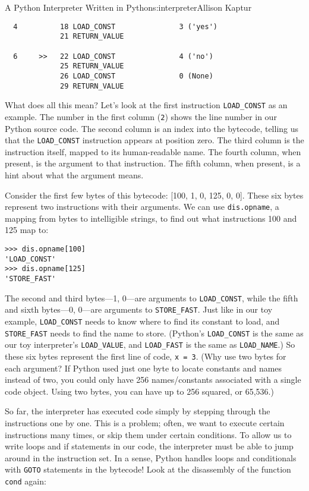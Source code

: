 \begin{aosachapter}{A Python Interpreter Written in Python}{s:interpreter}{Allison Kaptur}
\begin{verbatim}
  4          18 LOAD_CONST               3 ('yes')
             21 RETURN_VALUE

  6     >>   22 LOAD_CONST               4 ('no')
             25 RETURN_VALUE
             26 LOAD_CONST               0 (None)
             29 RETURN_VALUE
\end{verbatim}

What does all this mean? Let's look at the first instruction
\texttt{LOAD\_CONST} as an example. The number in the first column
(\texttt{2}) shows the line number in our Python source code. The second
column is an index into the bytecode, telling us that the
\texttt{LOAD\_CONST} instruction appears at position zero. The third
column is the instruction itself, mapped to its human-readable name. The
fourth column, when present, is the argument to that instruction. The
fifth column, when present, is a hint about what the argument means.

Consider the first few bytes of this bytecode: {[}100, 1, 0, 125, 0,
0{]}. These six bytes represent two instructions with their arguments.
We can use \texttt{dis.opname}, a mapping from bytes to intelligible
strings, to find out what instructions 100 and 125 map to:

\begin{verbatim}
>>> dis.opname[100]
'LOAD_CONST'
>>> dis.opname[125]
'STORE_FAST'
\end{verbatim}

The second and third bytes---1, 0---are arguments to
\texttt{LOAD\_CONST}, while the fifth and sixth bytes---0, 0---are
arguments to \texttt{STORE\_FAST}. Just like in our toy example,
\texttt{LOAD\_CONST} needs to know where to find its constant to load,
and \texttt{STORE\_FAST} needs to find the name to store. (Python's
\texttt{LOAD\_CONST} is the same as our toy interpreter's
\texttt{LOAD\_VALUE}, and \texttt{LOAD\_FAST} is the same as
\texttt{LOAD\_NAME}.) So these six bytes represent the first line of
code, \texttt{x = 3}. (Why use two bytes for each argument? If Python
used just one byte to locate constants and names instead of two, you
could only have 256 names/constants associated with a single code
object. Using two bytes, you can have up to 256 squared, or 65,536.)

\label{conditionals-and-loops}

So far, the interpreter has executed code simply by stepping through the
instructions one by one. This is a problem; often, we want to execute
certain instructions many times, or skip them under certain conditions.
To allow us to write loops and if statements in our code, the
interpreter must be able to jump around in the instruction set. In a
sense, Python handles loops and conditionals with \texttt{GOTO}
statements in the bytecode! Look at the disassembly of the function
\texttt{cond} again:


\end{aosachapter}
